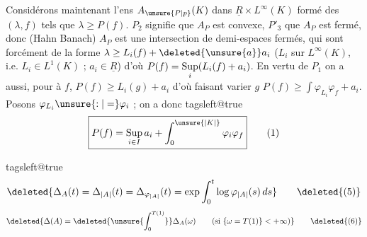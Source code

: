 Considérons maintenant l'ens $A_{\unsure{P|p}}(K)$ dans $\underline R\times L^\infty(K)$ formé des $(\lambda,f)$ tels que $\lambda\geq P(f)$. $P_2$ signifie que $A_P$ est convexe, $P'_3$ que $A_P$ est  fermé, donc (Hahn Banach) $A_P$ est une intersection de demi-espaces  fermés,
 qui sont forcément de la forme $\lambda\geq L_i(f)+\deleted{\unsure{a}}a_i$ ($L_i$    sur $L^\infty(K)$, i.e. $L_i\in L^1(K)$ ;  $a_i\in\underline R$) d'où  $P(f)=\mathop{\rm Sup}\limits_i(L_i(f)+a_i)$. En vertu de $P_1$ on a  aussi, pour      à $f$, $P(f)\geq L_i(g)+a_i$ d'où  faisant varier $g$ $P(f)\geq\int\varphi_{L_i}\varphi_f+a_i$. Posons $\varphi_{L_i}\unsure{:|=}\varphi_i$ ; on a donc
\begingroup\csname tagsleft@true\endcsname
\[
\boxed{P(f)=\mathop{\rm Sup}\limits_{i\in I}a_i+\int_0^{\unsure{\lvert K\rvert}}\varphi_i\varphi_f}
\tag*{(1)}
\]
\endgroup

\begingroup\csname tagsleft@true\endcsname
\[
\deleted{\Delta_A(t)=\Delta_{\lvert A\rvert}(t)=\Delta_{\varphi_{\lvert A\rvert}}(t)
=\exp\int_0^t\log\varphi_{\lvert A\rvert}(s)\,ds}
\tag*{\deleted{(5)}}
\]
\[
\deleted{\Delta(A)=\deleted{\unsure{\int_0^{T(1)}}}\Delta_A(\omega)
\qquad(\text{si }\{\omega=T(1)\}<+\infty)}
\tag*{\deleted{(6)}}
\]
\endgroup


